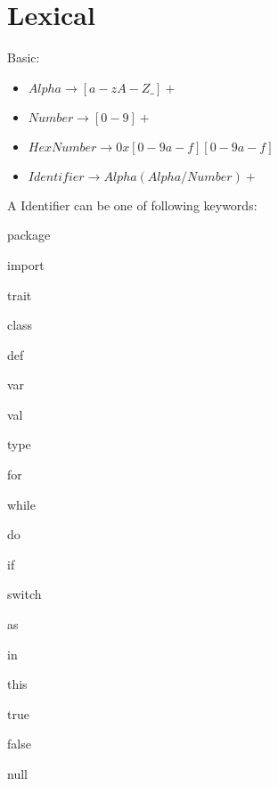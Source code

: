 \section{Lexical}
Basic:

\begin{itemize}
\item $Alpha \rightarrow [a-zA-Z\_]+$
\item $Number \rightarrow [0-9]+$
\item $HexNumber \rightarrow 0x[0-9a-f][0-9a-f]$
\item $Identifier \rightarrow Alpha (Alpha / Number)+$
\end{itemize}

A Identifier can be one of following keywords:
\begin{multicols}{4}
\begin{list}{}{}
\item package 
\item import
\item trait 
\item class 
\item def 
\item var 
\item val 
\item type 
\item for 
\item while 
\item do 
\item if 
\item switch 
\item as
\item in
\item this
\item true
\item false
\item null
\end{list}
\end{multicols}

